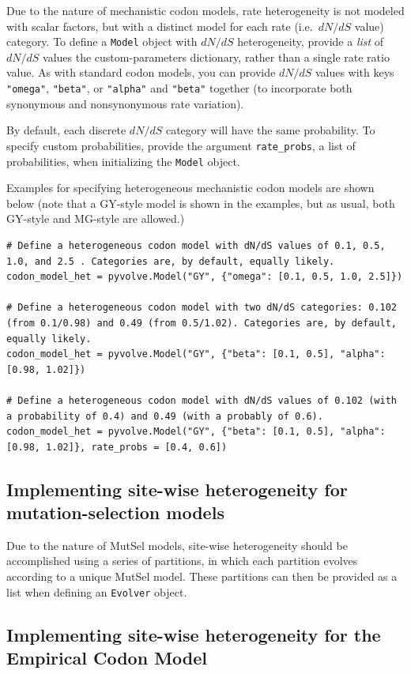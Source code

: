 \documentclass{article}
\newcommand{\code}[1]{\texttt{\small{#1}}}
\begin{document}
Due to the nature of mechanistic codon models, rate heterogeneity is not modeled with scalar factors, but with a distinct model for each rate (i.e.\, $dN/dS$ value) category. To define a \code{Model} object with $dN/dS$ heterogeneity, provide a \emph{list} of $dN/dS$ values the custom-parameters dictionary, rather than a single rate ratio value. As with standard codon models, you can provide $dN/dS$ values with keys \code{"omega"}, \code{"beta"}, or \code{"alpha"} and \code{"beta"} together (to incorporate both synonymous and nonsynonymous rate variation).

By default, each discrete $dN/dS$ category will have the same probability. To specify custom probabilities, provide the argument \code{rate\_probs}, a list of probabilities, when initializing the \code{Model} object.

Examples for specifying heterogeneous mechanistic codon models are shown below (note that a GY-style model is shown in the examples, but as usual, both GY-style and MG-style are allowed.)
\begin{lstlisting}
# Define a heterogeneous codon model with dN/dS values of 0.1, 0.5, 1.0, and 2.5 . Categories are, by default, equally likely.
codon_model_het = pyvolve.Model("GY", {"omega": [0.1, 0.5, 1.0, 2.5]})

# Define a heterogeneous codon model with two dN/dS categories: 0.102 (from 0.1/0.98) and 0.49 (from 0.5/1.02). Categories are, by default, equally likely.
codon_model_het = pyvolve.Model("GY", {"beta": [0.1, 0.5], "alpha": [0.98, 1.02]})

# Define a heterogeneous codon model with dN/dS values of 0.102 (with a probability of 0.4) and 0.49 (with a probably of 0.6).
codon_model_het = pyvolve.Model("GY", {"beta": [0.1, 0.5], "alpha": [0.98, 1.02]}, rate_probs = [0.4, 0.6])
\end{lstlisting}


\subsection{Implementing site-wise heterogeneity for mutation-selection models}

Due to the nature of MutSel models, site-wise heterogeneity should be accomplished using a series of partitions, in which each partition evolves according to a unique MutSel model. These partitions can then be provided as a list when defining an \code{Evolver} object.


\subsection{Implementing site-wise heterogeneity for the Empirical Codon Model}
\end{document}
